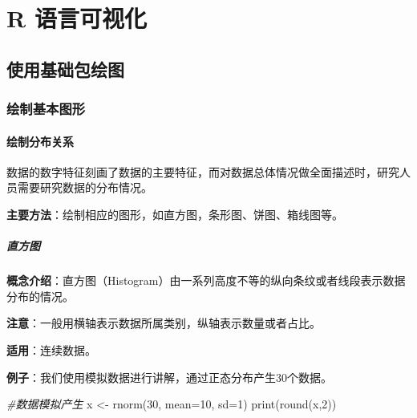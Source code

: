 \documentclass[
]{book}
\newenvironment{Shaded}{\begin{snugshade}}{\end{snugshade}}
\newcommand{\AttributeTok}[1]{\textcolor[rgb]{0.77,0.63,0.00}{#1}}
\newcommand{\CommentTok}[1]{\textcolor[rgb]{0.56,0.35,0.01}{\textit{#1}}}
\newcommand{\DecValTok}[1]{\textcolor[rgb]{0.00,0.00,0.81}{#1}}
\newcommand{\FunctionTok}[1]{\textcolor[rgb]{0.00,0.00,0.00}{#1}}
\newcommand{\NormalTok}[1]{#1}
\newcommand{\OtherTok}[1]{\textcolor[rgb]{0.56,0.35,0.01}{#1}}
\begin{document}
\hypertarget{part-r-ux8bedux8a00ux53efux89c6ux5316}{%
\part{R 语言可视化}\label{part-r-ux8bedux8a00ux53efux89c6ux5316}}

\hypertarget{causal}{%
\chapter{使用基础包绘图}\label{causal}}

\hypertarget{ux7ed8ux5236ux57faux672cux56feux5f62}{%
\section{绘制基本图形}\label{ux7ed8ux5236ux57faux672cux56feux5f62}}

\hypertarget{ux7ed8ux5236ux5206ux5e03ux5173ux7cfb}{%
\subsection{绘制分布关系}\label{ux7ed8ux5236ux5206ux5e03ux5173ux7cfb}}

数据的数字特征刻画了数据的主要特征，而对数据总体情况做全面描述时，研究人员需要研究数据的分布情况。

\textbf{主要方法}：绘制相应的图形，如直方图，条形图、饼图、箱线图等。

\hypertarget{ux76f4ux65b9ux56fe}{%
\subsubsection{直方图}\label{ux76f4ux65b9ux56fe}}

\textbf{概念介绍}：直方图（Histogram）由一系列高度不等的纵向条纹或者线段表示数据分布的情况。

\textbf{注意}：一般用横轴表示数据所属类别，纵轴表示数量或者占比。

\textbf{适用}：连续数据。

\textbf{例子}：我们使用模拟数据进行讲解，通过正态分布产生30个数据。

\begin{Shaded}
\begin{Highlighting}[]
\CommentTok{\#数据模拟产生}
\NormalTok{x }\OtherTok{\textless{}{-}} \FunctionTok{rnorm}\NormalTok{(}\DecValTok{30}\NormalTok{, }\AttributeTok{mean=}\DecValTok{10}\NormalTok{, }\AttributeTok{sd=}\DecValTok{1}\NormalTok{)}
\FunctionTok{print}\NormalTok{(}\FunctionTok{round}\NormalTok{(x,}\DecValTok{2}\NormalTok{))}
\end{Highlighting}
\end{Shaded}
\end{document}
